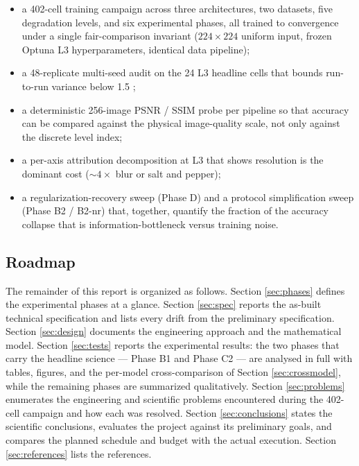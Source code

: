 \begin{itemize}
  \item a 402-cell training campaign across three architectures, two
        datasets, five degradation levels, and six experimental phases, all
        trained to convergence under a single fair-comparison invariant
        ($224 \times 224$ uniform input, frozen Optuna L3 hyperparameters,
        identical data pipeline);
  \item a 48-replicate multi-seed audit on the 24 L3 headline cells that
        bounds run-to-run variance below 1.5 \Mpp{};
  \item a deterministic 256-image PSNR / SSIM probe per pipeline so that
        accuracy can be compared against the physical image-quality scale,
        not only against the discrete level index;
  \item a per-axis attribution decomposition at L3 that shows resolution is
        the dominant cost ($\sim 4 \times$ blur or salt and pepper);
  \item a regularization-recovery sweep (Phase D) and a protocol simplification
        sweep (Phase B2 / B2-nr) that, together, quantify the fraction of the
        accuracy collapse that is information-bottleneck versus training noise.
\end{itemize}

\subsection{Roadmap}
The remainder of this report is organized as follows. Section
\ref{sec:phases} defines the experimental phases at a glance. Section
\ref{sec:spec} reports the as-built technical specification and lists every
drift from the preliminary specification. Section \ref{sec:design} documents
the engineering approach and the mathematical model. Section \ref{sec:tests}
reports the experimental results: the two phases that carry the headline
science --- Phase B1 and Phase C2 --- are analysed in full with tables,
figures, and the per-model cross-comparison of Section \ref{sec:crossmodel},
while the remaining phases are summarized qualitatively. Section
\ref{sec:problems} enumerates the engineering and scientific problems
encountered during the 402-cell campaign and how each was resolved. Section
\ref{sec:conclusions} states the scientific conclusions, evaluates the project
against its preliminary goals, and compares the planned schedule and budget
with the actual execution. Section \ref{sec:references} lists the references.
